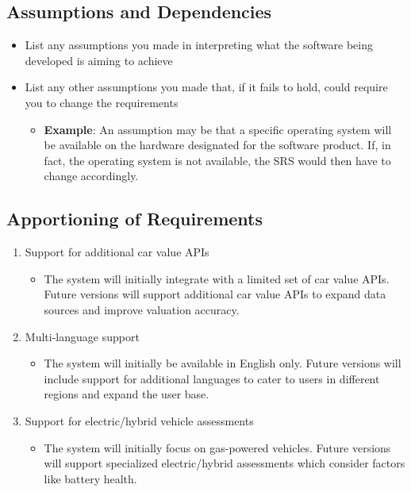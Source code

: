 \documentclass[]{article}
\begin{document}
\subsection{Assumptions and Dependencies}
\label{sub:assumptions_and_dependencies}
\begin{itemize}
	\item List any assumptions you made in interpreting what the software being developed is aiming to achieve
	\item List any other assumptions you made that, if it fails to hold, could require you to change the requirements
	\begin{itemize}
		\item \textbf{Example}: An assumption may be that a specific operating system will be available on the hardware designated for the software product. If, in fact, the operating system is not available, the SRS would then have to change accordingly.
	\end{itemize}
\end{itemize}

\subsection{Apportioning of Requirements}
\label{sub:apportioning_of_requirements}
\begin{enumerate}
	\item Support for additional car value APIs
	\begin{itemize}
    \item The system will initially integrate with a limited set of car value APIs. Future versions will support additional car value APIs to expand data sources and improve valuation accuracy.
  \end{itemize}
	\item Multi-language support
	\begin{itemize}
    \item The system will initially be available in English only. Future versions will include support for additional languages to cater to users in different regions and expand the user base.
  \end{itemize}
	\item Support for electric/hybrid vehicle assessments
	\begin{itemize}
    \item The system will initially focus on gas-powered vehicles. Future versions will support specialized electric/hybrid assessments which consider factors like battery health.
  \end{itemize} 
\end{enumerate}
\end{document}
